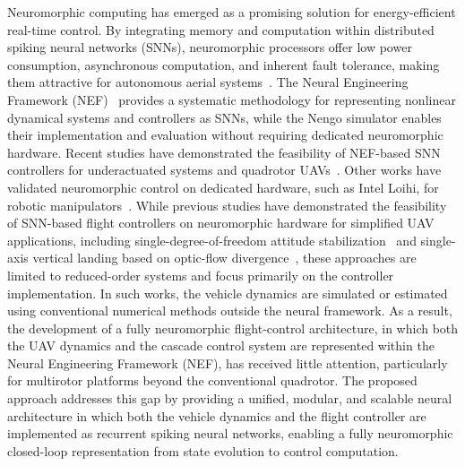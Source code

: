 \documentclass[conference]{IEEEtran}
\begin{document}
Neuromorphic computing has emerged as a promising solution for energy-efficient real-time control. By integrating memory and computation within distributed spiking neural networks (SNNs), neuromorphic processors offer low power consumption, asynchronous computation, and inherent fault tolerance, making them attractive for autonomous aerial systems~\cite{rajendran_low-power_2019,bouvier_spiking_2019}. The Neural Engineering Framework (NEF)~\cite{eliasmith_how_2013,Eliasmith2011} provides a systematic methodology for representing nonlinear dynamical systems and controllers as SNNs, while the Nengo simulator enables their implementation and evaluation without requiring dedicated neuromorphic hardware.
Recent studies have demonstrated the feasibility of NEF-based SNN controllers for underactuated systems and quadrotor UAVs~\cite{OmarCCE,DiegoNICE,OmarACC,Olivares2025,olivares_self-tuning_2026}. Other works have validated neuromorphic control on dedicated hardware, such as Intel Loihi, for robotic manipulators~\cite{dewolf_neuromorphic_2023}. While previous studies have demonstrated the feasibility of SNN-based flight controllers on neuromorphic hardware for simplified UAV applications, including single-degree-of-freedom attitude stabilization~\cite{Stagsted2020,Vitale2020} and single-axis vertical landing based on optic-flow divergence~\cite{Dupeyroux2021}, these approaches are limited to reduced-order systems and focus primarily on the controller implementation. In such works, the vehicle dynamics are simulated or estimated using conventional numerical methods outside the neural framework. As a result, the development of a fully neuromorphic flight-control architecture, in which both the UAV dynamics and the cascade control system are represented within the Neural Engineering Framework (NEF), has received little attention, particularly for multirotor platforms beyond the conventional quadrotor. The proposed approach addresses this gap by providing a unified, modular, and scalable neural architecture in which both the vehicle dynamics and the flight controller are implemented as recurrent spiking neural networks, enabling a fully neuromorphic closed-loop representation from state evolution to control computation.

\end{document}
